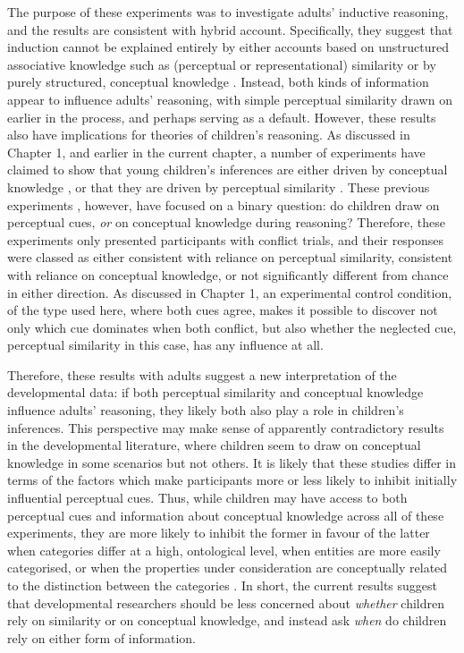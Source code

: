 The purpose of these experiments
was to investigate adults' inductive reasoning,
and the results are consistent with  hybrid account.
Specifically, they suggest that induction cannot be explained entirely
by either accounts based on unstructured associative knowledge
such as (perceptual or representational) similarity
\citep[i.e.][]{Sloman1993,Rogers2004,Sloutsky2004,Fisher2015}
or by purely structured, conceptual knowledge
\citep[i.e.][]{Osherson1990,Griffiths2009,Kemp2009,Gelman1986}.
Instead, both kinds of information appear to influence adults' reasoning,
with simple perceptual similarity drawn on earlier in the process,
and perhaps serving as a default.
However, these results also have implications for theories of children's reasoning.
As discussed in Chapter 1, and earlier in the current chapter,
a number of experiments have claimed to show that
young children's inferences are either
driven by conceptual knowledge
\citep{Gelman2013c,Rhodes2009,Gelman2007a,Gelman1986},
or that they are driven by perceptual similarity
\citep{Sloutsky2008,Sloutsky2007,Sloutsky2004a}.
These previous experiments \citep[i.e.][]{Gelman1986,Sloutsky2007,Gelman2013c},
however, have focused on a binary question:
do children draw on perceptual cues, \emph{or} on conceptual knowledge during reasoning?
Therefore, these experiments only presented participants with conflict trials,
and their responses were classed as either
consistent with reliance on perceptual similarity,
consistent with reliance on conceptual knowledge,
or not significantly different from chance in either direction.
As discussed in Chapter 1,
an experimental control condition, of the type used here,
where both cues agree, makes it possible to discover
not only which cue dominates when both conflict,
but also whether the neglected cue,
perceptual similarity in this case,
has any influence at all.

Therefore, these results with adults suggest a new interpretation
of the developmental data:
if both perceptual similarity and conceptual knowledge influence adults' reasoning,
they likely both also play a role in children's inferences.
This perspective may make sense of
apparently contradictory results in the developmental literature,
where children seem to draw on conceptual knowledge
in some scenarios but not others.
It is likely that these studies differ
in terms of the factors which make participants
more or less likely to inhibit initially influential perceptual cues.
Thus, while children may have access to both perceptual cues
and information about conceptual knowledge across all of these experiments,
they are more likely to inhibit the former in favour of the latter
when categories differ at a high, ontological level,
when entities are more easily categorised,
or when the properties under consideration are
conceptually related to the distinction between the categories
\citep{Gelman2013c}.
In short, the current results suggest that
developmental researchers should be less concerned
about \emph{whether} children rely on similarity or on conceptual knowledge,
and instead ask \emph{when} do children rely on either form of information.



